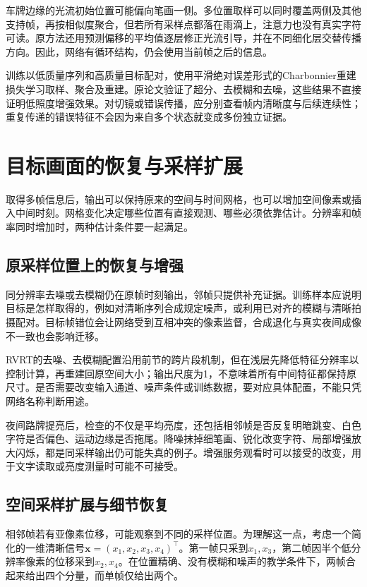 车牌边缘的光流初始位置可能偏向笔画一侧。多位置取样可以同时覆盖两侧及其他支持帧，再按相似度聚合，但若所有采样点都落在雨滴上，注意力也没有真实字符可读。原方法还用预测偏移的平均值逐层修正光流引导，并在不同细化层交替传播方向。因此，网络有循环结构，仍会使用当前帧之后的信息。

训练以低质量序列和高质量目标配对，使用平滑绝对误差形式的Charbonnier重建损失学习取样、聚合及重建。原论文验证了超分、去模糊和去噪，这些结果不直接证明低照度增强效果。对切镜或错误传播，应分别查看帧内清晰度与后续连续性；重复传递的错误特征不会因为来自多个状态就变成多份独立证据。

\section{目标画面的恢复与采样扩展}
\label{sec:vision-video-restoration-output}

取得多帧信息后，输出可以保持原来的空间与时间网格，也可以增加空间像素或插入中间时刻。网格变化决定哪些位置有直接观测、哪些必须依靠估计。分辨率和帧率同时增加时，两种估计条件要一起满足。

\subsection{原采样位置上的恢复与增强}
\label{sec:vision-video-native-restoration}

同分辨率去噪或去模糊仍在原帧时刻输出，邻帧只提供补充证据。训练样本应说明目标是怎样取得的，例如对清晰序列合成规定噪声，或利用已对齐的模糊与清晰拍摄配对。目标帧错位会让网络受到互相冲突的像素监督，合成退化与真实夜间成像不一致也会影响迁移。

RVRT的去噪、去模糊配置沿用前节的跨片段机制，但在浅层先降低特征分辨率以控制计算，再重建回原空间大小；输出尺度为1，不意味着所有中间特征都保持原尺寸。是否需要改变输入通道、噪声条件或训练数据，要对应具体配置，不能只凭网络名称判断用途。

夜间路牌提亮后，检查的不仅是平均亮度，还包括相邻帧是否反复明暗跳变、白色字符是否偏色、运动边缘是否拖尾。降噪抹掉细笔画、锐化改变字符、局部增强放大闪烁，都是同采样输出仍可能失真的例子。增强服务观看时可以接受的改变，用于文字读取或亮度测量时可能不可接受。

\subsection{空间采样扩展与细节恢复}
\label{sec:vision-video-super-resolution}

相邻帧若有亚像素位移，可能观察到不同的采样位置。为理解这一点，考虑一个简化的一维清晰信号$\bm{x}=(x_1,x_2,x_3,x_4)^\top$。第一帧只采到$x_1,x_3$，第二帧因半个低分辨率像素的位移采到$x_2,x_4$。在位置精确、没有模糊和噪声的教学条件下，两帧合起来给出四个分量，而单帧仅给出两个。

